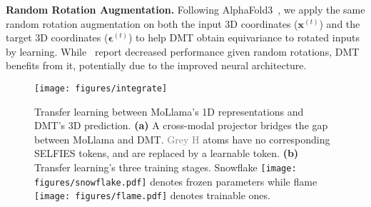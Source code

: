 \textbf{Random Rotation Augmentation.} Following AlphaFold3~\citep{AF3}, we apply the same random rotation augmentation on both the input 3D coordinates ($\mathbf{x}^{(t)}$) and the target 3D coordinates ($\mathbf{\boldsymbol{\epsilon}}^{(t)}$) to help DMT obtain equivariance to rotated inputs by learning. While~\citep{MCF} report decreased performance given random rotations, DMT benefits from it, potentially due to the improved neural architecture.






\begin{figure}[t]
    \centering
    \texttt{[image: figures/integrate]}
    \vspace{-1mm}
    \caption{Transfer learning between MoLlama's 1D representations and DMT's 3D prediction. \textbf{(a)} A cross-modal projector bridges the gap between MoLlama and DMT. \textcolor{gray}{Grey H} atoms have no corresponding SELFIES tokens, and are replaced by a learnable token.
    \textbf{(b)} Transfer learning's three training stages. Snowflake \texttt{[image: figures/snowflake.pdf]} denotes frozen parameters while flame \texttt{[image: figures/flame.pdf]} denotes trainable ones.}
    \label{fig:integrate}
    \vspace{-5mm}
\end{figure}


